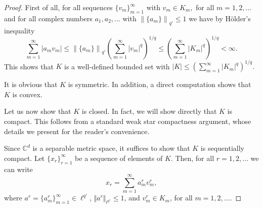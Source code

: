 \documentclass{article}
\theoremstyle{definition}
\theoremstyle{remark}
\numberwithin{equation}{section}
\newcommand{\norm}[2]{\left\|{#1}\right\|_{{#2}}}
\newcommand{\complex}{\mathbb{C}}
\newcommand{\1}{\mathbf{1}}
\begin{document}
    \begin{proof}
        First of all, for all sequences $\{ v_{m}\}_{m=1}^{\infty}$ with $v_m\in K_m,$ for all $m=1,2,\ldots$ and for all complex numbers $a_1,a_2,\ldots$ with $\norm{\{a_m\}}{q'}\leq1$ we have by H\"older's inequality
        \begin{equation*}
            \sum_{m=1}^{\infty}|a_mv_m|\leq\norm{\{a_m\}}{q'}\left(\sum_{m=1}^{\infty}|v_m|^{q}\right)^{1/q}\leq\left(\sum_{m=1}^{\infty}|K_m|^{q}\right)^{1/q}<\infty.
        \end{equation*}
        This shows that $K$ is a well-defined bounded set with $|K|\leq \left(\sum_{m=1}^{\infty}|K_m|^{q}\right)^{1/q}.$

        It is obvious that $K$ is symmetric. In addition, a direct computation shows that $K$ is convex.


        Let us now show that $K$ is closed. In fact, we will show directly that $K$ is compact. This follows from a standard weak star compactness argument, whose details we present for the reader's convenience.

        Since $\complex^{d}$ is a separable metric space, it suffices to show that $K$ is sequentially compact. Let $\{x_{r}\}^{\infty}_{r=1}$ be a sequence of elements of $K$. Then, for all $r=1,2,\ldots$ we can write
        \begin{equation*}
            x_{r} = \sum_{m=1}^{\infty}a^{r}_{m}v_{m}^{r},
        \end{equation*}
        where $a^{r}=\{a^{r}_m\}_{m=1}^{\infty}\in\ell^{q'}$, $\Vert a^{r}\Vert_{\ell^{q'}}\leq1$, and $v_{m}^{r}\in K_m$, for all $m=1,2,\ldots$.


\end{proof}
\end{document}
